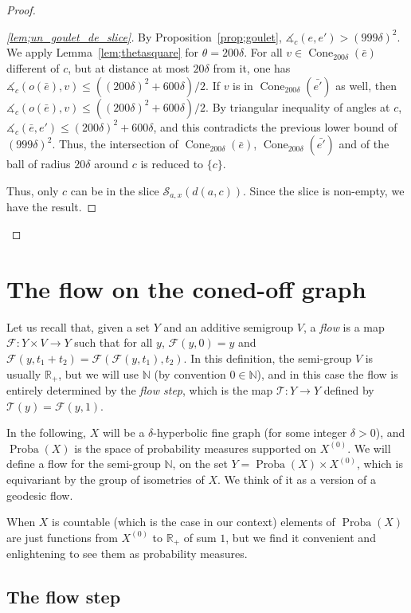 \documentclass[11pt]{article}
\theoremstyle{definition}
\numberwithin{equation}{section}
\DeclareMathOperator{\Co}{Cone}
\DeclareMathOperator{\Proba}{Proba}
\newcommand{\A}{\measuredangle}
\newenvironment*{laststep}{\begin{proof}}{\end{proof}}
\begin{document}
\begin{proof}
\begin{laststep}[\eqref{lem;un_goulet_de_slice}]
By Proposition~\ref{prop;goulet}, $\A_c(e, e') >(999\delta)^2$. We apply Lemma~\ref{lem;thetasquare} for $\theta=200\delta$. For all $v\in \Co_{200\delta}(\bar e)$ different of $c$, but at distance at most $20\delta$ from it, one has $\A_c(o(\bar e), v) \leq ((200\delta)^2 + 600\delta)/2$. If $v$ is in $\Co_{200\delta}(\bar{e'})$ as well, then $\A_c(o(\bar e), v) \leq ((200\delta)^2 + 600\delta)/2$. By triangular inequality of angles at $c$, $\A_c(\bar e, e')\leq (200\delta)^2 + 600\delta$, and this contradicts the previous lower bound of $(999\delta)^2$. Thus, the intersection of $\Co_{200\delta}(\bar e)$, $\Co_{200\delta}(\bar {e'})$ and of the ball of radius $20\delta$ around $c$ is reduced to $\{c\}$.

Thus, only $c$ can be in the slice $\mathcal{S}_{a,x} (d(a,c))$. Since the slice is non-empty, we have the result.
\end{laststep}
\let\qed\relax
\end{proof}

\section{The flow on the coned-off graph}

Let us recall that, given a set $Y$ and an additive semigroup $V$, a \emph{flow} is a map $\mathscr{F}: Y\times V \to Y$ such that for all $y$, $\mathscr{F}(y,0)=y$ and $\mathscr{F}(y, t_1+t_2) = \mathscr{F}(\mathscr{F}(y, t_1), t_2)$. In this definition, the semi-group $V$ is usually $\mathbb{R}_+$, but we will use $\mathbb{N}$ (by convention $0\in \mathbb{N}$), and in this case the flow is entirely determined by the \emph{flow step}, which is the map $\mathscr{T}: Y\to Y$ defined by $\mathscr{T} (y) = \mathscr{F}(y,1) $.

In the following, $X$ will be a $\delta$-hyperbolic fine graph (for some integer $\delta >0$), and $\Proba(X)$ is the space of probability measures supported on $X^{(0)}$. We will define a flow for the semi-group $\mathbb{N}$, on the set $Y= \Proba(X) \times X^{(0)}$, which is equivariant by the group of isometries of $X$. We think of it as a version of a geodesic flow.

When $X$ is countable (which is the case in our context) elements of $\Proba(X)$ are just functions from $X^{(0)}$ to $\mathbb{R}_+$ of sum $1$, but we find it convenient and enlightening to see them as probability measures.
\subsection{The flow step}\label{sec;def_flowstep}
\end{document}
